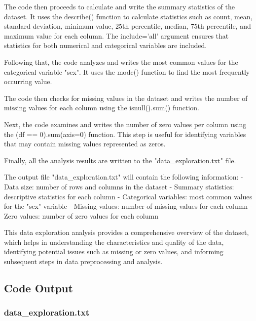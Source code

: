 \documentclass[11pt]{article}
\begin{document}
The code then proceeds to calculate and write the summary statistics of the dataset. It uses the describe() function to calculate statistics such as count, mean, standard deviation, minimum value, 25th percentile, median, 75th percentile, and maximum value for each column. The include='all' argument ensures that statistics for both numerical and categorical variables are included.

Following that, the code analyzes and writes the most common values for the categorical variable "sex". It uses the mode() function to find the most frequently occurring value.

The code then checks for missing values in the dataset and writes the number of missing values for each column using the isnull().sum() function.

Next, the code examines and writes the number of zero values per column using the (df == 0).sum(axis=0) function. This step is useful for identifying variables that may contain missing values represented as zeros.

Finally, all the analysis results are written to the "data\_exploration.txt" file.

The output file "data\_exploration.txt" will contain the following information:
- Data size: number of rows and columns in the dataset
- Summary statistics: descriptive statistics for each column
- Categorical variables: most common values for the "sex" variable
- Missing values: number of missing values for each column
- Zero values: number of zero values for each column

This data exploration analysis provides a comprehensive overview of the dataset, which helps in understanding the characteristics and quality of the data, identifying potential issues such as missing or zero values, and informing subsequent steps in data preprocessing and analysis.

\subsection{Code Output}

\subsubsection*{data\_exploration.txt}
\end{document}
